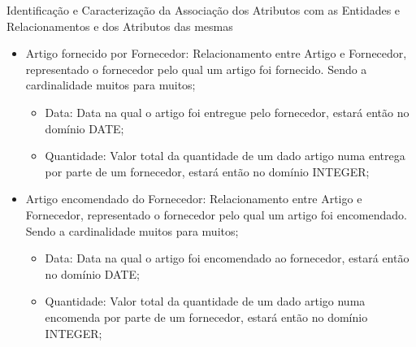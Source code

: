 \documentclass[compress,svgnames,handout,13.7pt]{beamer}
\begin{document}
\begin{frame}{Identificação e Caracterização da Associação dos Atributos com as Entidades e Relacionamentos e dos Atributos das mesmas}
\begin{itemize}
                 \item{Artigo fornecido por Fornecedor:} Relacionamento entre Artigo e Fornecedor, representado o fornecedor pelo qual um artigo foi fornecido. Sendo a cardinalidade muitos para muitos;
                     \begin{itemize}
                     \item{Data:} Data na qual o artigo foi entregue pelo fornecedor, estará então no domínio DATE;
                       
                     \item{Quantidade:} Valor total da quantidade de um dado artigo numa entrega por parte de um fornecedor, estará então no domínio INTEGER;
                       
                     \end{itemize}
                 \item{Artigo encomendado do Fornecedor:} Relacionamento entre Artigo e Fornecedor, representado o fornecedor pelo qual um artigo foi encomendado. Sendo a cardinalidade muitos para muitos;
                     \begin{itemize}
                     \item{Data:} Data na qual o artigo foi encomendado ao fornecedor, estará então no domínio DATE;
                       
                     \item{Quantidade:} Valor total da quantidade de um dado artigo numa encomenda por parte de um fornecedor, estará então no domínio INTEGER;
                       
                     \end{itemize}
\end{itemize}
\end{frame}
\end{document}
